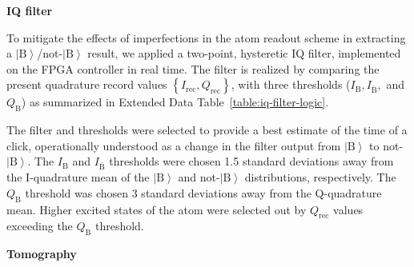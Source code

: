 \documentclass[
	 			preprint,     		superscriptaddress, 																longbibliography,
		amsmath, amssymb,
		aps,  prb,   		floatfix,
		linenumbers     
	]{revtex4-1}
\newcommand{\ket}[1]{\left|#1\right>}
\begin{document}
\textbf{IQ filter} 

To mitigate the effects of imperfections in the atom readout scheme in extracting a $\ket{\mathrm{B}}$/not-$\ket{\mathrm{B}}$ result, we applied a two-point, hysteretic IQ filter, implemented on the FPGA controller in real time. 
The filter is realized by comparing the present quadrature record values $ \left\{ I_\mathrm{rec}, Q_\mathrm{rec}\right\} $, with three thresholds ($I_\mathrm{B}, I_{\bar{\mathrm{B}}},$ and $Q_\mathrm{B}$) as summarized in Extended Data Table~\ref{table:iq-filter-logic}.
	
The filter and thresholds were selected to provide a best estimate of the time of a click, operationally understood as a change in the filter output from $\ket{\mathrm{B}}$ to not-$\ket{\mathrm{B}}$.
The $I_{{\mathrm{B}}}$ and  $I_{\bar{\mathrm{B}}}$ thresholds were chosen 1.5 standard deviations away from the I-quadrature mean of the $\ket{\mathrm{B}}$ and not-$\ket{\mathrm{B}}$  distributions, respectively.
The  $Q_{{\mathrm{B}}}$ threshold was chosen 3 standard deviations away from the Q-quadrature mean. Higher excited states of the atom were selected out by $Q_\mathrm{rec} $ values exceeding the $Q_\mathrm{B}$ threshold. 





\textbf{Tomography} 
\end{document}
